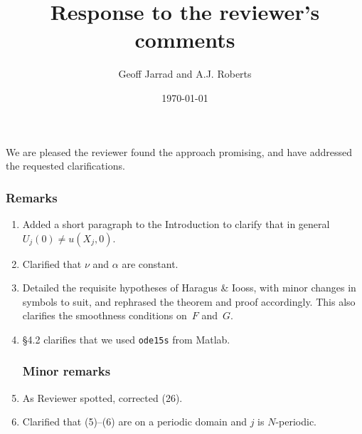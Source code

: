 \documentclass[11pt,a4paper]{article}
\title{Response to the reviewer's comments}
\author{Geoff Jarrad and A.J. Roberts}
\date{\today}
\begin{document}
\maketitle

We are pleased the reviewer found the approach promising, and have addressed the requested clarifications.
\subsubsection*{Remarks}
\begin{enumerate}
\item Added a short paragraph to the Introduction to clarify that in general \(U_j(0)\neq u(X_j,0)\).

\item Clarified that \(\nu\) and \(\alpha\) are constant.

\item Detailed the requisite hypotheses of Haragus \& Iooss, with minor changes in symbols to suit, and rephrased the theorem and proof accordingly.  This also clarifies the smoothness conditions on~\(F\) and~\(G\).

\item \S4.2 clarifies that we used \verb|ode15s| from Matlab.

\subsubsection*{Minor remarks}

\item As Reviewer spotted, corrected (26).

\item Clarified that (5)--(6) are on a periodic domain and \(j\) is \(N\)-periodic.

\end{enumerate}
\end{document}
